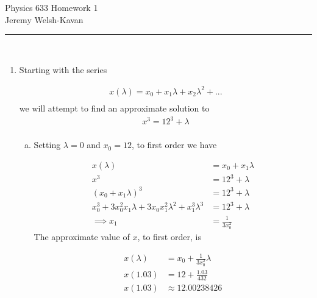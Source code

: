 \documentclass[]{article}
\begin{document}
{\Large Physics 633 Homework 1}\\
{Jeremy Welsh-Kavan}\\
\vspace{0.2 cm}
\begin{center}
\noindent\rule{15cm}{0.4pt} \\
\end{center}

\begin{enumerate}[1)]

\item Starting with the series

\begin{equation}
\begin{split}
x(\lambda) = x_0 + x_1\lambda + x_2\lambda^2 + ...\\
\end{split}
\end{equation}
we will attempt to find an approximate solution to 
\begin{equation}
\begin{split}
x^3 = 12^3 + \lambda \\
\end{split}
\end{equation}

\begin{enumerate}[a)]

\item Setting $\lambda = 0$ and $x_0 = 12$, to first order we have 

\begin{equation}
\begin{split}
x(\lambda) & = x_0 + x_1\lambda \\
x^3 &= 12^3 + \lambda \\
(x_0 + x_1\lambda)^3 &= 12^3 + \lambda \\
x_0^3 + 3x_0^2x_1\lambda+3x_0x_1^2\lambda^2 + x_1^3\lambda^3 & = 12^3 + \lambda \\
\implies x_1 & = \frac{1}{3x_0^2}
\end{split}
\end{equation}
The approximate value of $x$, to first order, is

\begin{equation}
\begin{split}
x(\lambda) & = x_0 + \frac{1}{3x_0^2}\lambda \\
x(1.03) & = 12 + \frac{1.03}{432}\\
x(1.03) & \approx 12.00238426 \\
\end{split}
\end{equation}


\end{enumerate}
\end{enumerate}
\end{document}
